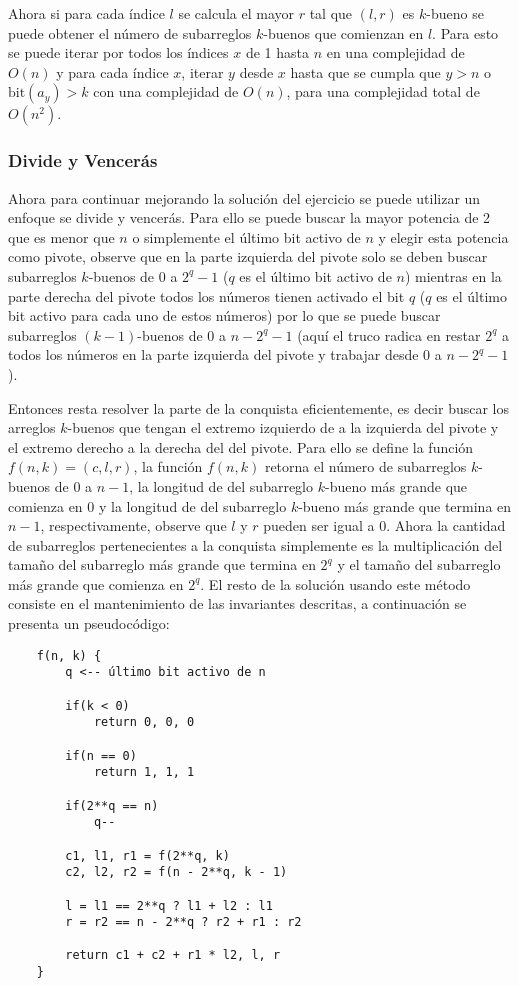 \documentclass{article}
\begin{document}
Ahora si para cada índice $l$ se calcula el mayor $r$ tal que $(l,r)$ es $k$-bueno se puede obtener el número de subarreglos $k$-buenos
que comienzan en $l$. Para esto se puede iterar por todos los índices $x$ de 1 hasta $n$ en una complejidad de $O(n)$ y para cada
índice $x$, iterar $y$ desde $x$ hasta que se cumpla que $y>n$ o $\text{bit}(a_y)>k$ con una complejidad de $O(n)$, para una complejidad
total de $O(n^2)$.

\subsubsection{Divide y Vencerás}

Ahora para continuar mejorando la solución del ejercicio se puede utilizar un enfoque se divide y vencerás. Para ello se puede
buscar la mayor potencia de 2 que es menor que $n$ o simplemente el último bit activo de $n$ y elegir esta potencia como pivote,
observe que en la parte izquierda del pivote solo se deben buscar subarreglos $k$-buenos de 0 a $2^q-1$ ($q$ es el último bit activo de $n$)
mientras en la parte derecha del pivote todos los números tienen activado el bit $q$ ($q$ es el último bit activo para cada uno de
estos números) por lo que se puede buscar subarreglos $(k-1)$-buenos de 0 a $n-2^q-1$ (aquí el truco radica en restar $2^q$ a todos los
números en la parte izquierda del pivote y trabajar desde 0 a $n-2^q-1$).

Entonces resta resolver la parte de la conquista eficientemente, es decir buscar los arreglos $k$-buenos que tengan el extremo
izquierdo de a la izquierda del pivote y el extremo derecho a la derecha del del pivote. Para ello se define la función $f(n,k)=(c,l,r)$,
la función $f(n,k)$ retorna el número de subarreglos $k$-buenos de 0 a $n-1$, la longitud de del subarreglo $k$-bueno más grande
que comienza en 0 y la longitud de del subarreglo $k$-bueno más grande que termina en $n-1$, respectivamente, observe que $l$ y $r$ pueden
ser igual a 0. Ahora la cantidad de subarreglos pertenecientes a la conquista simplemente es la multiplicación del tamaño del
subarreglo más grande que termina en $2^q$ y el tamaño del subarreglo más grande que comienza en $2^q$. El resto de la solución
usando este método consiste en el mantenimiento de las invariantes descritas, a continuación se presenta un pseudocódigo:

\begin{verbatim}
    f(n, k) {
        q <-- último bit activo de n 

        if(k < 0)
            return 0, 0, 0

        if(n == 0)
            return 1, 1, 1

        if(2**q == n) 
            q--

        c1, l1, r1 = f(2**q, k)
        c2, l2, r2 = f(n - 2**q, k - 1)

        l = l1 == 2**q ? l1 + l2 : l1
        r = r2 == n - 2**q ? r2 + r1 : r2

        return c1 + c2 + r1 * l2, l, r 
    }
\end{verbatim}
\end{document}
